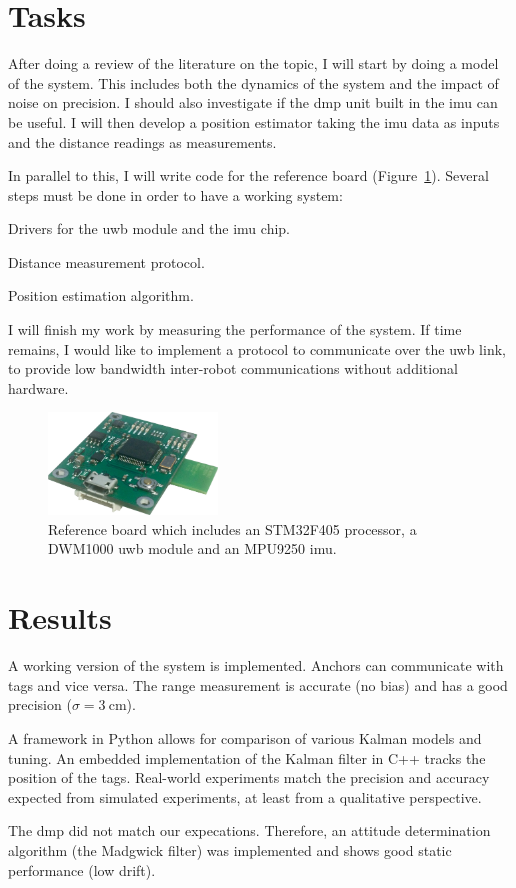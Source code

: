 \documentclass[a4paper,twocolumn]{article}
\begin{document}
\section{Tasks}

After doing a review of the literature on the topic, I will start by doing a model of the system.
This includes both the dynamics of the system and the impact of noise on precision.
I should also investigate if the \gls{dmp} unit built in the \gls{imu} can be useful.
I will then develop a position estimator taking the \gls{imu} data as inputs and the distance readings as measurements.

In parallel to this, I will write code for the reference board (Figure~\ref{fig:board}).
Several steps must be done in order to have a working system:
\begin{inparaenum}
    \item Drivers for the \gls{uwb} module and the \gls{imu} chip.
    \item Distance measurement protocol.
    \item Position estimation algorithm.
\end{inparaenum}

I will finish my work by measuring the performance of the system.
If time remains, I would like to implement a protocol to communicate over the \gls{uwb} link, to provide low bandwidth inter-robot communications without additional hardware.

\begin{figure}[h!]
    \centering
    \includegraphics[width=0.4\textwidth]{figures/board}
    \caption{Reference board which includes an STM32F405 processor, a DWM1000 \gls{uwb} module and an MPU9250 \gls{imu}.}
    \label{fig:board}
\end{figure}

\section{Results}
A working version of the system is implemented.
Anchors can communicate with tags and vice versa.
The range measurement is accurate (no bias) and has a good precision ($\sigma = \SI{3}{\centi\meter}$).

A framework in Python allows for comparison of various Kalman models and tuning.
An embedded implementation of the Kalman filter in C++ tracks the position of the tags.
Real-world experiments match the precision and accuracy expected from simulated experiments, at least from a qualitative perspective.

The \gls{dmp} did not match our expecations.
Therefore, an attitude determination algorithm (the Madgwick filter) was implemented and shows good static performance (low drift).
\end{document}
